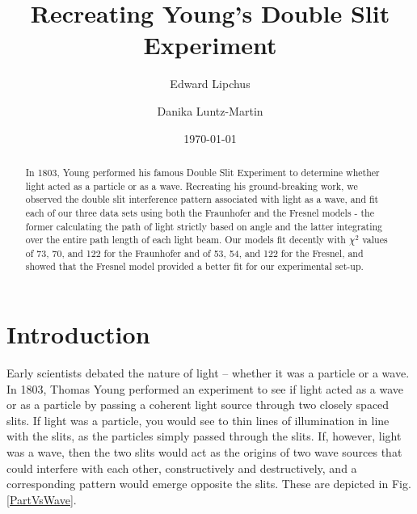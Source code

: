 \documentclass[prb,preprint]{revtex4-1}
\begin{document}
\title{Recreating Young's Double Slit Experiment}


\author{Edward Lipchus}


\author{Danika Luntz-Martin}


\date{\today}



\begin{abstract}

In 1803, Young performed his famous Double Slit Experiment to determine whether light acted as a particle or as a wave. Recreating his ground-breaking work, we observed the double slit interference pattern associated with light as a wave, and fit each of our three data sets using both the Fraunhofer and the Fresnel models - the former calculating the path of light strictly based on angle and the latter integrating over the entire path length of each light beam. Our models fit decently with $\chi^2$ values of 73, 70, and 122 for the Fraunhofer and of 53, 54, and 122 for the Fresnel, and showed that the Fresnel model provided a better fit for our experimental set-up.

\end{abstract}

\maketitle 


\section{Introduction} 

Early scientists debated the nature of light – whether it was a particle or a wave. In 1803, Thomas Young performed an experiment to see if light acted as a wave or as a particle by passing a coherent light source through two closely spaced slits. If light was a particle, you would see to thin lines of illumination in line with the slits, as the particles simply passed through the slits. If, however, light was a wave, then the two slits would act as the origins of two wave sources that could interfere with each other, constructively and destructively, and a corresponding pattern would emerge opposite the slits. These are depicted in Fig. \ref{PartVsWave}.
\end{document}
